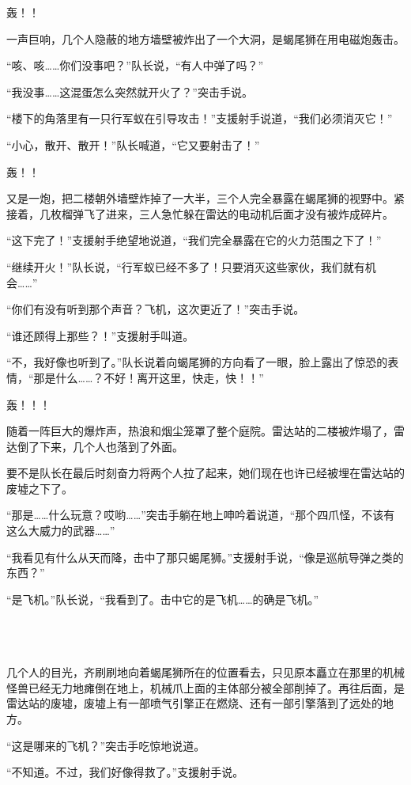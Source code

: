 轰！！

一声巨响，几个人隐蔽的地方墙壁被炸出了一个大洞，是蝎尾狮在用电磁炮轰击。

“咳、咳……你们没事吧？”队长说，“有人中弹了吗？”

“我没事……这混蛋怎么突然就开火了？”突击手说。

“楼下的角落里有一只行军蚁在引导攻击！”支援射手说道，“我们必须消灭它！”

“小心，散开、散开！”队长喊道，“它又要射击了！”

轰！！

又是一炮，把二楼朝外墙壁炸掉了一大半，三个人完全暴露在蝎尾狮的视野中。紧接着，几枚榴弹飞了进来，三人急忙躲在雷达的电动机后面才没有被炸成碎片。

“这下完了！”支援射手绝望地说道，“我们完全暴露在它的火力范围之下了！”

“继续开火！”队长说，“行军蚁已经不多了！只要消灭这些家伙，我们就有机会……”

“你们有没有听到那个声音？飞机，这次更近了！”突击手说。

“谁还顾得上那些？！”支援射手叫道。

“不，我好像也听到了。”队长说着向蝎尾狮的方向看了一眼，脸上露出了惊恐的表情，“那是什么……？不好！离开这里，快走，快！！”

轰！！！

随着一阵巨大的爆炸声，热浪和烟尘笼罩了整个庭院。雷达站的二楼被炸塌了，雷达倒了下来，几个人也落到了外面。

要不是队长在最后时刻奋力将两个人拉了起来，她们现在也许已经被埋在雷达站的废墟之下了。

“那是……什么玩意？哎哟……”突击手躺在地上呻吟着说道，“那个四爪怪，不该有这么大威力的武器……”

“我看见有什么从天而降，击中了那只蝎尾狮。”支援射手说，“像是巡航导弹之类的东西？”

“是飞机。”队长说，“我看到了。击中它的是飞机……的确是飞机。”



 \section*{}

几个人的目光，齐刷刷地向着蝎尾狮所在的位置看去，只见原本矗立在那里的机械怪兽已经无力地瘫倒在地上，机械爪上面的主体部分被全部削掉了。再往后面，是雷达站的废墟，废墟上有一部喷气引擎正在燃烧、还有一部引擎落到了远处的地方。

“这是哪来的飞机？”突击手吃惊地说道。

“不知道。不过，我们好像得救了。”支援射手说。

